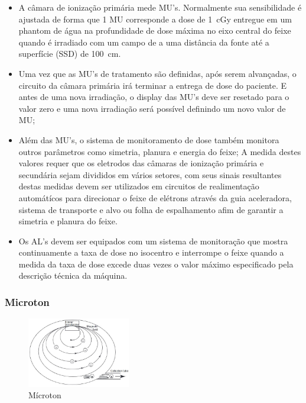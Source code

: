 \documentclass[11pt,a4paper]{article}
\begin{document}
\begin{itemize}
                        \item A câmara de ionização primária mede MU's. Normalmente sua sensibilidade é ajustada de forma que 1 MU corresponde a dose de \qty{1}{cGy} entregue em um phantom de água na profundidade de dose máxima no eixo central do feixe quando é irradiado com um campo de  a uma distância da fonte até a superfície (SSD) de \qty{100}{cm}.
                        
                        \item Uma vez que as MU's de tratamento são definidas, após serem alvançadas, o circuito da câmara primária irá terminar a entrega de dose do paciente. E antes de uma nova irradiação, o display das MU's deve ser resetado para o valor zero e uma nova irradiação será possível definindo um novo valor de MU;
                        
                        \item Além das MU's, o sistema de monitoramento de dose também monitora outros parâmetros como simetria, planura e energia do feixe; A medida destes valores requer que os eletrodos das câmaras de ionização primária e secundária sejam divididos em vários setores, com seus sinais resultantes destas medidas devem ser utilizados em circuitos de realimentação automátícos para direcionar o feixe de elétrons através da guia aceleradora, sistema de transporte e alvo ou folha de espalhamento afim de garantir a simetria e planura do feixe.
                        
                        \item Os AL's devem ser equipados com um sistema de monitoração que mostra continuamente a taxa de dose no isocentro e interrompe o feixe quando a medida da taxa de dose excede duas vezes o valor máximo especificado pela descrição técnica da máquina.
                    

                    \end{itemize}
            
            \subsubsection{Microton}

                \begin{figure}
                    \centering
                    \includegraphics[width=0.4\textwidth]{Imagens/microton.jpg}
                    \caption{Mícroton}
                    \label{fig:microton}
                \end{figure}
                    
\end{document}

